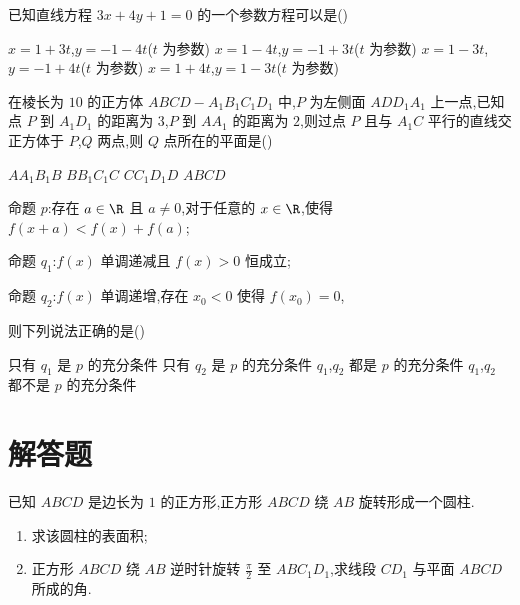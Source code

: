 \begin{problem}
已知直线方程 \(3x+4y+1=0\) 的一个参数方程可以是(\quad)

\choices
    {\(x=1+3t\),\(y=-1-4t\)(\(t\) 为参数)}
    {\(x=1-4t\),\(y=-1+3t\)(\(t\) 为参数)}
    {\(x=1-3t\),\(y=-1+4t\)(\(t\) 为参数)}
    {\(x=1+4t\),\(y=1-3t\)(\(t\) 为参数)}
\end{problem}

\begin{problem}
在棱长为 \(10\) 的正方体 \(ABCD-A_1B_1C_1D_1\) 中,\(P\) 为左侧面 \(ADD_1A_1\) 上一点,已知点 \(P\) 到 \(A_1D_1\) 的距离为 \(3\),\(P\) 到 \(AA_1\) 的距离为 \(2\),则过点 \(P\) 且与 \(A_1C\) 平行的直线交正方体于 \(P\),\(Q\) 两点,则 \(Q\) 点所在的平面是(\quad)


\choices
    {\(AA_1B_1B\)}
    {\(BB_1C_1C\)}
    {\(CC_1D_1D\)}
    {\(ABCD\)}
\end{problem}

\begin{problem}
命题 \(p\):存在 \(a\in\R\) 且 \(a\neq0\),对于任意的 \(x\in\R\),使得 \(f(x+a)<f(x)+f(a)\);

命题 \(q_1\):\(f(x)\) 单调递减且 \(f(x)>0\) 恒成立;

命题 \(q_2\):\(f(x)\) 单调递增,存在 \(x_0<0\) 使得 \(f(x_0)=0\),

则下列说法正确的是(\quad)

\choices
    {只有 \(q_1\) 是 \(p\) 的充分条件}
    {只有 \(q_2\) 是 \(p\) 的充分条件}
    {\(q_1\),\(q_2\) 都是 \(p\) 的充分条件}
    {\(q_1\),\(q_2\) 都不是 \(p\) 的充分条件}
\end{problem}

\section{解答题}

\begin{problem}
已知 \(ABCD\) 是边长为 \(1\) 的正方形,正方形 \(ABCD\) 绕 \(AB\) 旋转形成一个圆柱.

\begin{enumerate}
\item 求该圆柱的表面积;
\item 正方形 \(ABCD\) 绕 \(AB\) 逆时针旋转 \(\frac{\pi}{2}\) 至 \(ABC_1D_1\),求线段 \(CD_1\) 与平面 \(ABCD\) 所成的角.
\end{enumerate}

\end{problem}

